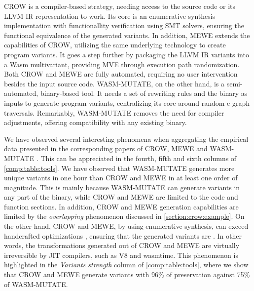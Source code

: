 CROW is a compiler-based strategy, needing access to the source code or its LLVM IR representation to work. 
Its core is an enumerative synthesis implementation with functionallity verification using SMT solvers, ensuring the functional equivalence of the generated variants.
In addition, MEWE extends the capabilities of CROW, utilizing the same underlying technology to create program variants. 
It goes a step further by packaging the LLVM IR variants into a Wasm multivariant, providing MVE through execution path randomization.
Both CROW and MEWE are fully automated, requiring no user intervention besides the input source code.
WASM-MUTATE, on the other hand, is a semi-automated, binary-based tool.
It needs a set of rewriting rules and the \wasm binary as inputs to generate program variants, centralizing its core around random e-graph traversals. 
Remarkably, WASM-MUTATE removes the need for compiler adjustments, offering compatibility with any existing \Wasm binary. 



We have observed several interesting phenomena when aggregating the empirical data presented in the corresponding papers of CROW, MEWE and WASM-MUTATE \cite{CROW,MEWE, wasmmutate}. 
This can be appreciated in the fourth, fifth and sixth columns of \autoref{comp:table:tools}.
We have observed that WASM-MUTATE generates more unique variants in one hour than CROW and MEWE in at least one order of magnitude.
This is mainly because WASM-MUTATE can generate variants in any part of the \wasm binary, while CROW and MEWE are limited to the code and function sections.
In addition, CROW and MEWE generation capabilities are limited by the \emph{overlapping} phenomenon discussed in \autoref{section:crow:example}.
On the other hand, CROW and MEWE, by using enumerative synthesis, can exceed handcrafted optimizations \cite{Sasnauskas2017Souper:Superoptimizer}, ensuring that the generated variants are . 
In other words, the transformations generated out of CROW and MEWE are virtually irreversible by JIT compilers, such as V8 and wasmtime.
This phenomenon is highlighted in the \emph{Variants strength} column of \autoref{comp:table:tools}, where we show that CROW and MEWE generate variants with 96\% of preservation against 75\% of WASM-MUTATE.



